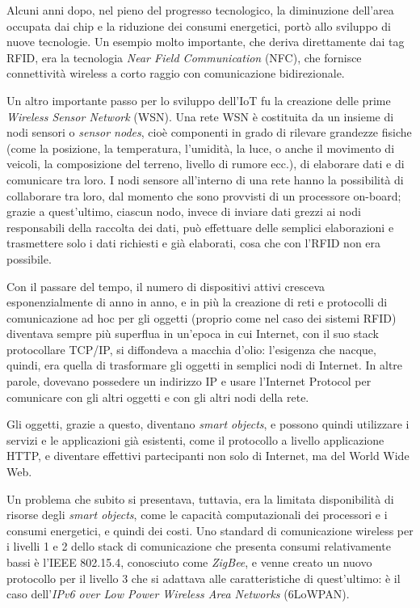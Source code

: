 Alcuni anni dopo, nel pieno del progresso tecnologico, la diminuzione dell'area occupata dai chip e la riduzione dei consumi energetici, portò allo sviluppo di nuove tecnologie. Un esempio molto importante, che deriva direttamente dai tag RFID, era la tecnologia \textit{Near Field Communication} (NFC), che fornisce connettività wireless a corto raggio con comunicazione bidirezionale.

Un altro importante passo per lo sviluppo dell'IoT fu la creazione delle prime \textit{Wireless Sensor Network} (WSN). Una rete WSN è costituita da un insieme di nodi sensori o \textit{sensor nodes}, cioè componenti in grado di rilevare grandezze fisiche (come la posizione, la temperatura, l'umidità, la luce, o anche il movimento di veicoli, la composizione del terreno, livello di rumore ecc.), di elaborare dati e di comunicare tra loro. I nodi sensore all'interno di una rete hanno la possibilità di collaborare tra loro, dal momento che sono provvisti di un processore on-board; grazie a quest'ultimo, ciascun nodo, invece di inviare dati grezzi ai nodi responsabili della raccolta dei dati, può effettuare delle semplici elaborazioni e trasmettere solo i dati richiesti e già elaborati, cosa che con l'RFID non era possibile. 

Con il passare del tempo, il numero di dispositivi attivi cresceva esponenzialmente di anno in anno, e in più la creazione di reti e protocolli di comunicazione ad hoc per gli oggetti (proprio come nel caso dei sistemi RFID) diventava sempre più superflua in un'epoca in cui Internet, con il suo stack protocollare TCP/IP, si diffondeva a macchia d'olio: l’esigenza che nacque, quindi, era quella di trasformare gli oggetti in semplici nodi di Internet. In altre parole, dovevano possedere un indirizzo IP e usare l'Internet Protocol per comunicare con gli altri oggetti e con gli altri nodi della rete.

Gli oggetti, grazie a questo, diventano \textit{smart objects}, e possono quindi utilizzare i servizi e le applicazioni già esistenti, come il protocollo a livello applicazione HTTP, e diventare effettivi partecipanti non solo di Internet, ma del World Wide Web. 

Un problema che subito si presentava, tuttavia, era la limitata disponibilità di risorse degli \textit{smart objects}, come le capacità computazionali dei processori e i consumi energetici, e quindi dei costi. Uno standard di comunicazione wireless per i livelli 1 e 2 dello stack di comunicazione che presenta consumi relativamente bassi è l'IEEE 802.15.4, conosciuto come \textit{ZigBee}, e venne creato un nuovo protocollo per il livello 3 che si adattava alle caratteristiche di quest'ultimo: è il caso dell'\textit{IPv6 over Low Power Wireless Area Networks} (6LoWPAN).

